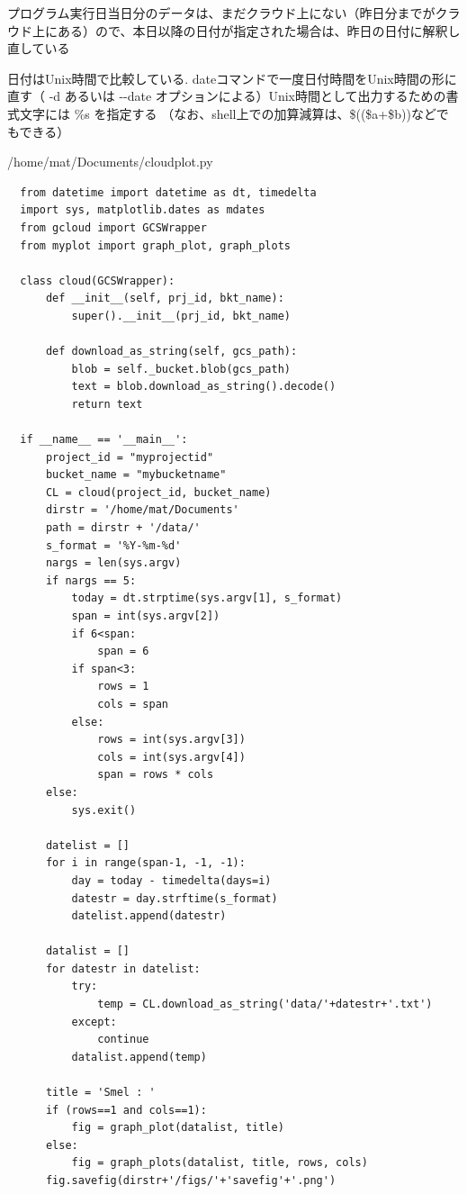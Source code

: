 \documentclass[12pt,a4j]{jsbook}
\begin{document}
プログラム実行日当日分のデータは、まだクラウド上にない（昨日分までがクラウド上にある）ので、本日以降の日付が指定された場合は、昨日の日付に解釈し直している

日付はUnix時間で比較している.
dateコマンドで一度日付時間をUnix時間の形に直す（ -d あるいは -\;-date オプションによる）Unix時間として出力するための書式文字には \%s を指定する
（なお、shell上での加算減算は、\$((\$a+\$b))などでもできる）

\newpage

\begin{spacing}{0.8}
\begin{breakbox}[l]{/home/mat/Documents/cloudplot.py}
\begin{verbatim}
  from datetime import datetime as dt, timedelta
  import sys, matplotlib.dates as mdates
  from gcloud import GCSWrapper
  from myplot import graph_plot, graph_plots

  class cloud(GCSWrapper):
      def __init__(self, prj_id, bkt_name):
          super().__init__(prj_id, bkt_name)

      def download_as_string(self, gcs_path):
          blob = self._bucket.blob(gcs_path)
          text = blob.download_as_string().decode()
          return text

  if __name__ == '__main__':
      project_id = "myprojectid"
      bucket_name = "mybucketname"
      CL = cloud(project_id, bucket_name)
      dirstr = '/home/mat/Documents'
      path = dirstr + '/data/'
      s_format = '%Y-%m-%d'
      nargs = len(sys.argv)
      if nargs == 5:
          today = dt.strptime(sys.argv[1], s_format)
          span = int(sys.argv[2])
          if 6<span:
              span = 6
          if span<3:
              rows = 1
              cols = span
          else:
              rows = int(sys.argv[3])
              cols = int(sys.argv[4])
              span = rows * cols
      else:
          sys.exit()

      datelist = []
      for i in range(span-1, -1, -1):
          day = today - timedelta(days=i)
          datestr = day.strftime(s_format)
          datelist.append(datestr)

      datalist = []
      for datestr in datelist:
          try:
              temp = CL.download_as_string('data/'+datestr+'.txt')
          except:
              continue
          datalist.append(temp)

      title = 'Smel : '
      if (rows==1 and cols==1):
          fig = graph_plot(datalist, title)
      else:
          fig = graph_plots(datalist, title, rows, cols)
      fig.savefig(dirstr+'/figs/'+'savefig'+'.png')
\end{verbatim}
\end{breakbox}
\end{spacing}
\end{document}
